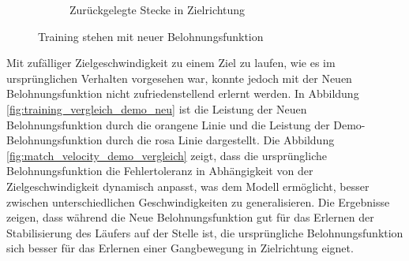 \begin{figure}[H]
\begin{subfigure}{.49\textwidth}
      \caption{Zurückgelegte Stecke in Zielrichtung}
      \label{fig:126_move_target_dir}
    \end{subfigure}
  \caption{Training stehen mit neuer Belohnungsfunktion}
  \label{fig:training_stehen_neu}
\end{figure}

Mit zufälliger Zielgeschwindigkeit zu einem Ziel zu laufen, wie es im ursprünglichen Verhalten vorgesehen war, konnte jedoch mit der Neuen Belohnungsfunktion nicht zufriedenstellend erlernt werden. In Abbildung \ref{fig:training_vergleich_demo_neu} ist die Leistung der Neuen Belohnungsfunktion durch die orangene Linie und die Leistung der Demo-Belohnungsfunktion durch die rosa Linie dargestellt. Die Abbildung \ref{fig:match_velocity_demo_vergleich} zeigt, dass die ursprüngliche Belohnungsfunktion die Fehlertoleranz in Abhängigkeit von der Zielgeschwindigkeit dynamisch anpasst, was dem Modell ermöglicht, besser zwischen unterschiedlichen Geschwindigkeiten zu generalisieren. Die Ergebnisse zeigen, dass während die Neue Belohnungsfunktion gut für das Erlernen der Stabilisierung des Läufers auf der Stelle ist, die ursprüngliche Belohnungsfunktion sich besser für das Erlernen einer Gangbewegung in Zielrichtung eignet.

